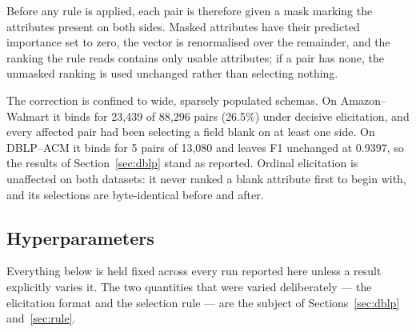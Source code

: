 \documentclass[11pt]{article}
\begin{document}
Before any rule is applied, each pair is therefore given a mask marking the attributes
present on both sides. Masked attributes have their predicted importance set to zero, the
vector is renormalised over the remainder, and the ranking the rule reads contains only
usable attributes; if a pair has none, the unmasked ranking is used unchanged rather than
selecting nothing.

The correction is confined to wide, sparsely populated schemas. On Amazon--Walmart it binds
for 23{,}439 of 88{,}296 pairs (26.5\%) under decisive elicitation, and every affected pair
had been selecting a field blank on at least one side. On DBLP--ACM it binds for 5 pairs of
13{,}080 and leaves F1 unchanged at 0.9397, so the results of Section~\ref{sec:dblp} stand
as reported. Ordinal elicitation is unaffected on both datasets: it never ranked a blank
attribute first to begin with, and its selections are byte-identical before and after.

\subsection{Hyperparameters}
\label{sec:hyper}

Everything below is held fixed across every run reported here unless a result explicitly
varies it. The two quantities that were varied deliberately --- the elicitation format and
the selection rule --- are the subject of Sections~\ref{sec:dblp} and~\ref{sec:rule}.
\end{document}
